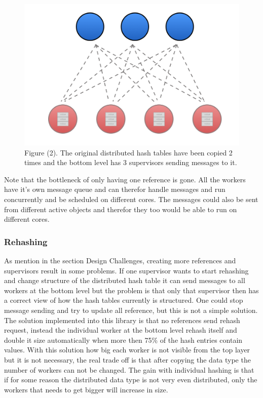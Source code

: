 \begin{figure}[h]
\includegraphics[width=12cm]{images/WithManySupr}
Figure (2). The original distributed hash tables have been copied 2 times and the bottom level has 3 supervisors sending messages to it. 
\end{figure}

Note that the bottleneck of only having one reference is gone. All the workers have it's own message queue and can therefor handle messages and run concurrently and be scheduled on different cores. The messages could also be sent from different active objects and therefor they too would be able to run on different cores.

\subsubsection{Rehashing}
As mention in the section Design Challenges, creating more references and supervisors result in some problems. If one supervisor wants to start rehashing and change structure of the distributed hash table it can send messages to all workers at the bottom level but the problem is that only that supervisor then has a correct view of how the hash tables currently is structured. One could stop message sending and try to update all reference, but this is not a simple solution. \\

The solution implemented into this library is that no references send rehash request, instead the individual worker at the bottom level rehash itself and double it size automatically when more then 75\% of the hash entries contain values. With this solution how big each worker is not visible from the top layer but it is not necessary, the real trade off is that after copying the data type the number of workers can not be changed. The gain with individual hashing is that if for some reason the distributed data type is not very even distributed, only the workers that needs to get bigger will increase in size.   

